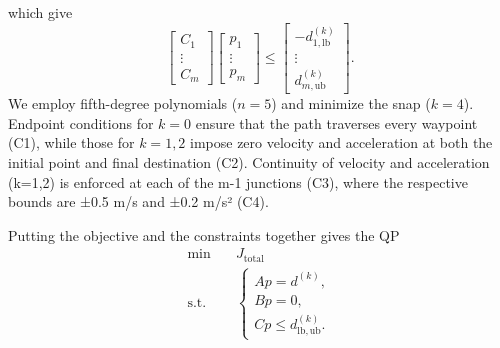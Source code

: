 which give
\begin{equation}
\begin{bmatrix} C_1\\ \vdots\\ C_m \end{bmatrix}
\begin{bmatrix} p_1\\ \vdots\\ p_m \end{bmatrix}
\le
\begin{bmatrix} -d^{(k)}_{1,\mathrm{lb}}\\ \vdots\\ d^{(k)}_{m,\mathrm{ub}} \end{bmatrix}.
\label{eq:Cineq}
\end{equation}
We employ fifth-degree polynomials ($n=5$) and minimize the snap ($k=4$). Endpoint conditions for \(k=0\) ensure that the path traverses every waypoint (C1), while those for \(k=1,2\) impose zero velocity and acceleration at both the initial point and final destination (C2). Continuity of velocity and acceleration (k=1,2) is enforced at each of the m-1 junctions (C3), where the respective bounds are ±0.5 m/s and ±0.2 m/s² (C4).

Putting the objective and the constraints together gives the QP
\begin{equation}
\begin{aligned}
\min \quad & J_{\text{total}}\\
\text{s.t.} \quad &
\begin{cases}
A p = d^{(k)},\\
B p = 0,\\
C p \le d^{(k)}_{\mathrm{lb},\mathrm{ub}}.
\end{cases}
\end{aligned}
\label{eq:qp}
\end{equation}

